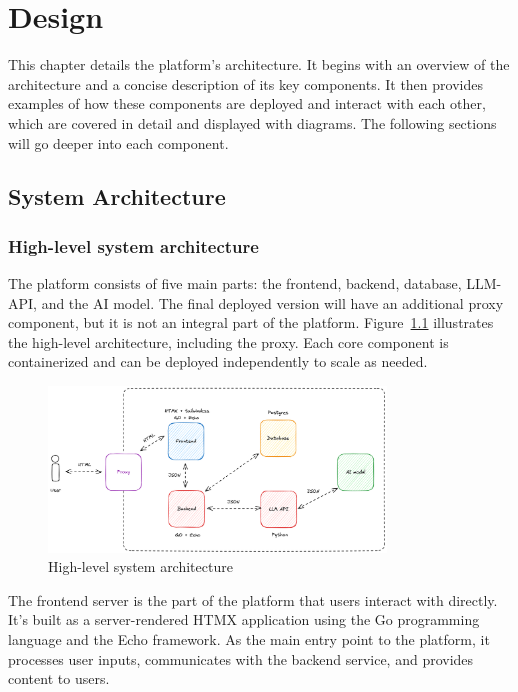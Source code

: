 \chapter{Design}

This chapter details the platform's architecture. It begins with an overview of the architecture and a concise description of its key components. It then provides examples of how these components are deployed and interact with each other, which are covered in detail and displayed with diagrams. The following sections will go deeper into each component.

\section{System Architecture}

\subsection{High-level system architecture}

The platform consists of five main parts: the frontend, backend, database, LLM-API, and the AI model. The final deployed version will have an additional proxy component, but it is not an integral part of the platform. Figure~\ref{fig:high-level-architecture} illustrates the high-level architecture, including the proxy. Each core component is containerized and can be deployed independently to scale as needed.

\begin{figure}[!h]
    \centering
    \includegraphics[width=0.8\textwidth, keepaspectratio]{figures/high-level-architecture.png}
    \caption{High-level system architecture}
    \label{fig:high-level-architecture}
\end{figure}

The frontend server is the part of the platform that users interact with directly. It's built as a server-rendered HTMX application using the Go programming language and the Echo framework. As the main entry point to the platform, it processes user inputs, communicates with the backend service, and provides content to users.


